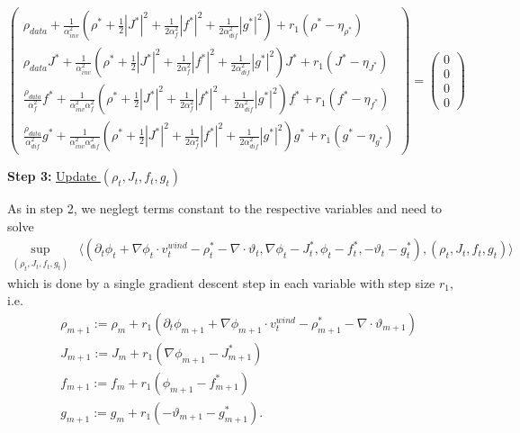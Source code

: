 $$
\begin{pmatrix}
	\rho_{data}+\frac{1}{\alpha_{inv}^2}\left(\rho^* + \frac{1}{2}|J^*|^2 + \frac{1}{2\alpha_f^2}|f^*|^2 + \frac{1}{2\alpha_{dif}^2}|g^*|^2\right) + r_1(\rho^*-\eta_{\rho^*})\\
	\rho_{data}J^* + \frac{1}{\alpha_{inv}^2}\left(\rho^* + \frac{1}{2}|J^*|^2 + \frac{1}{2\alpha_f^2}|f^*|^2 + \frac{1}{2\alpha_{dif}^2}|g^*|^2\right)J^* + r_1(J^* - \eta_{J^*})\\
	\frac{\rho_{data}}{\alpha_f^2}f^* + \frac{1}{\alpha_{inv}^2\alpha_f^2}\left(\rho^* + \frac{1}{2}|J^*|^2 + \frac{1}{2\alpha_f^2}|f^*|^2 + \frac{1}{2\alpha_{dif}^2}|g^*|^2\right)f^*  + r_1(f^* - \eta_{f^*})\\
	\frac{\rho_{data}}{\alpha_{dif}^2}g^* + \frac{1}{\alpha_{inv}^2\alpha_{dif}^2}\left(\rho^* + \frac{1}{2}|J^*|^2 + \frac{1}{2\alpha_f^2}|f^*|^2 + \frac{1}{2\alpha_{dif}^2}|g^*|^2\right) g^* + r_1(g^* - \eta_{g^*})
\end{pmatrix} = \begin{pmatrix}
0\\0\\0\\0
\end{pmatrix}
$$


\textbf{Step 3:} \underline{Update $(\rho_t, J_t, f_t, g_t)$}

As in step 2, we neglegt terms constant to the respective variables and need to solve 
\begin{align*}
	\sup_{(\rho_t,J_t, f_t, g_t)}&\langle(\partial_t\phi_t + \nabla\phi_t \cdot v_t^{wind} - \rho_t^* - \nabla \cdot \vartheta_t, \nabla\phi_t - J_t^*, \phi_t - f_t^*, - \vartheta_t -g_t^*), (\rho_t, J_t, f_t, g_t)\rangle%
\end{align*}
which is done by a single gradient descent step in each variable with step size $r_1$, i.e. 
\begin{align*}
	&\rho_{m+1} := \rho_m + r_1 (\partial_t\phi_{m+1} + \nabla\phi_{m+1} \cdot v_t^{wind} - \rho_{m+1}^* - \nabla \cdot \vartheta_{m+1})\\
	&J_{m+1} := J_m + r_1(\nabla\phi_{m+1} - J_{m+1}^*)\\
	&f_{m+1} := f_m + r_1(\phi_{m+1} - f_{m+1}^*)\\%
	&g_{m+1} := g_m + r_1 (-\vartheta_{m+1} - g_{m+1}^*).
\end{align*}

